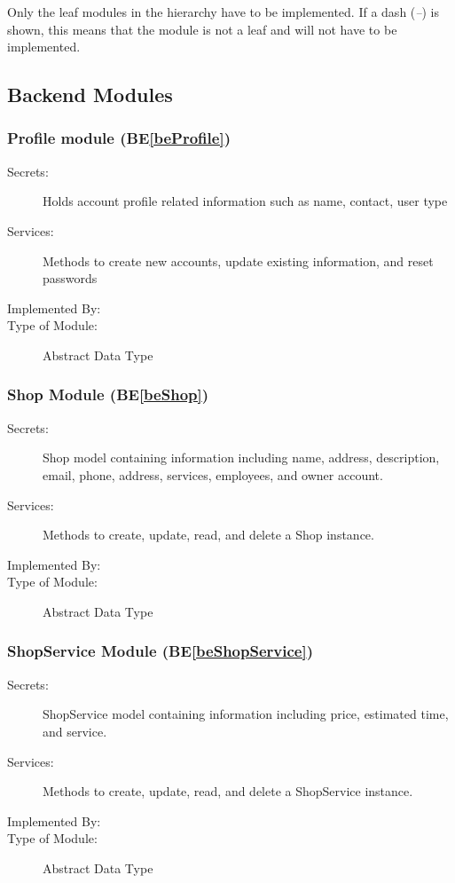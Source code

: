 \documentclass[12pt, titlepage]{article}
\newcommand{\beref}[1]{BE\ref{#1}}
\newcommand{\labelbedef}[1]{\label{be#1def}}
\begin{document}
Only the leaf modules in the hierarchy have to be implemented. If a dash
(\emph{--}) is shown, this means that the module is not a leaf and will not have
to be implemented.

\subsection{Backend Modules}
\subsubsection{Profile module (\beref{beProfile}) \labelbedef{Profile}}
\begin{description}
\item[Secrets:] Holds account profile related information such as name, contact, user type
\item[Services:] Methods to create new accounts, update existing information, and reset passwords
\item[Implemented By:] \progname
\item[Type of Module:] Abstract Data Type
\end{description}

\subsubsection{Shop Module (\beref{beShop}) \labelbedef{Shop}}

\begin{description}
\item[Secrets:] Shop model containing information including name, address, description, email, phone, address, services, employees, and owner account.
\item[Services:] Methods to create, update, read, and delete a Shop instance.
\item[Implemented By:] \progname
\item[Type of Module:] Abstract Data Type
\end{description}

\subsubsection{ShopService Module (\beref{beShopService}) \labelbedef{ShopService}}

\begin{description}
\item[Secrets:] ShopService model containing information including price, estimated time, and service.
\item[Services:] Methods to create, update, read, and delete a ShopService instance.
\item[Implemented By:] \progname
\item[Type of Module:] Abstract Data Type
\end{description}
\end{document}
